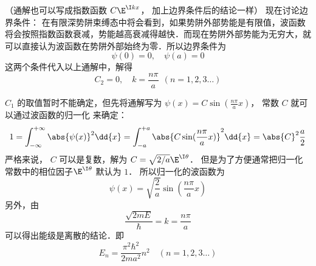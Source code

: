 （通解也可以写成指数函数 $C\E^{\I kx}$， 加上边界条件后的结论一样）
现在讨论边界条件： 在有限深势阱束缚态中将会看到，如果势阱外部势能是有限值，波函数将会按照指数函数衰减，势能越高衰减得越快．而现在势阱外部势能为无穷大，就可以直接认为波函数在势阱外部始终为零．所以边界条件为
\begin{equation}
\psi(0) = 0, \quad \psi(a) = 0
\end{equation}
这两个条件代入以上通解中，解得
\begin{equation}
C_2 = 0, \quad k = \frac{n\pi}{a}  \ \ (n = 1,2,3\dots)
\end{equation}

$C_1$ 的取值暂时不能确定，但先将通解写为 $\psi(x) = C\sin(\frac{n\pi }{a}x)$， 常数 $C$ 就可以通过波函数的归一化%
来确定：
\begin{equation}
1 = \int_{-\infty }^{+\infty } \abs{\psi(x)}^2 \dd{x}  = \int_{-a}^{+a} \abs{C\sin(\frac{n\pi }{a} x)}^2 \dd{x}  = \abs{C}^2 \frac{a}{2}
\end{equation}
严格来说， $C$ 可以是复数，解为 $C = \sqrt{2/a} \E^{\I\theta}$． 但是为了方便通常把归一化常数中的相位因子$\E^{\I\theta}$ 默认为 $1$． 所以归一化的波函数为
\begin{equation}
\psi(x) = \sqrt{\frac{2}{a}} \sin(\frac{n\pi }{a}x)
\end{equation}
另外，由
\begin{equation}
\frac{\sqrt{2mE}}{\hbar} = k = \frac{n\pi }{a}
\end{equation}
可以得出能级是离散的结论．即
\begin{equation}
E_n = \frac{\pi^2\hbar^2}{2m a^2} n^2 \quad (n = 1,2,3\dots)
\end{equation}

